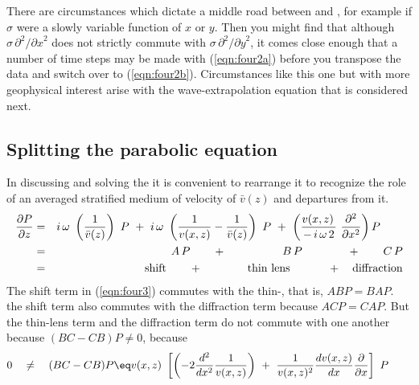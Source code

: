 \par
There are circumstances which
dictate a middle road between  and ,
for example if  $\sigma$  were a 
slowly variable function of  $x$  or  $y$.
Then you might find that although
$ {\sigma\, \partial}^2 / {\partial x}^2 $  does not
strictly commute with  $ {\sigma\, \partial}^2 / {\partial y}^2$,
it comes close enough that a number of time steps
may be made with (\ref{eqn:four2a})
before you transpose the data and switch over to (\ref{eqn:four2b}).
Circumstances like this one but with
more geophysical interest arise with
the wave-extrapolation equation that is considered next.

\subsection{Splitting the parabolic equation}
In discussing and solving the 
it is convenient to rearrange it
to recognize the role of
an averaged stratified medium of velocity of $\bar v(z)$
and departures from it.
\begin{eqnarray}
        {\partial P   \over  \partial z }
& = &
         i\,\omega\ \left( {1    \over \bar v(z)} \right)\ P
\ +\ 
         i\,\omega\ \left( {1\over v(x,z) } - {1\over \bar v(z)} \right)\ P
\ +\ 
        \left(
        {v(x,z)\, \over  - \, i \, \omega \, 2 } \
        {\partial^2   \over \partial x^2} \right) P \quad\quad
\label{eqn:four3} \\
& = & \ \   \quad\quad  A\,P \quad\quad +
        \quad\quad\quad \quad\quad
        B\,P
        \quad\quad\quad \quad
        +\quad \quad C\,P
                                                \nonumber \\
& = & \ \ \  \quad  \ {\rm shift} \quad\quad +
        \quad\quad\quad \quad
        {\rm thin\ lens}
        \quad\quad\quad \ 
        +\quad {\rm diffraction}
\nonumber
\end{eqnarray}
The shift term in (\ref{eqn:four3}) commutes
with the thin-\bx{lens term}, that is, $ABP=BAP$.
the shift term also commutes with the diffraction term because  $ACP=CAP$.
But the thin-lens term
and the diffraction term do not commute with one another
because $(BC-CB)P\ne 0$, because
\begin{equation}
0\quad\ne\quad
(BC-CB)P \eq  v(x,z)\
        \left[
                \left( -2 {d^2\over d x^2} { 1\over v(x,z)} \right)
                \ +\
                {1\over v(x,z)^2} {dv(x,z)\over dx} {\partial\over\partial x}
        \right] \ P \quad\quad
\end{equation}

